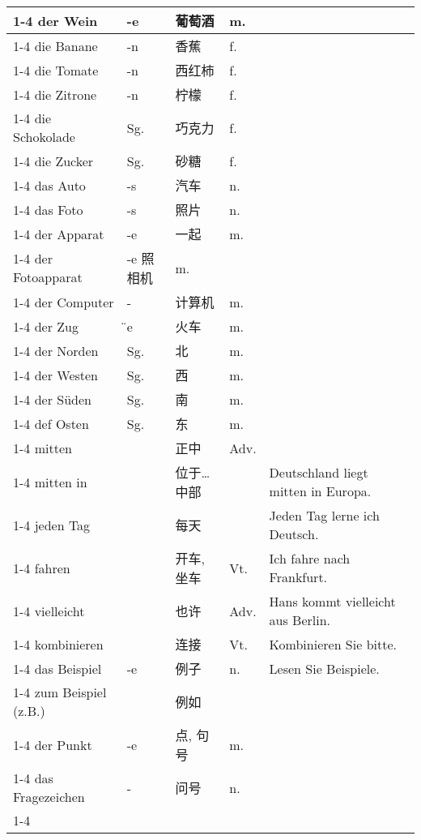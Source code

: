 \documentclass[hidelinks]{ctexart}
\newcommand{\gvocabcline}{\cline{1-4}}
\begin{document}
\begin{longtable}{lllll}
    \gvocabcline
    der Wein & -e & 葡萄酒 & m. \\
    \gvocabcline
    die Banane & -n & 香蕉 & f. \\
    \gvocabcline
    die Tomate & -n & 西红柿 & f. \\
    \gvocabcline
    die Zitrone & -n & 柠檬 & f. \\
    \gvocabcline
    die Schokolade & Sg. & 巧克力 & f. \\
    \gvocabcline
    die Zucker & Sg. & 砂糖 & f. \\
    \gvocabcline
    das Auto & -s & 汽车 & n. \\
    \gvocabcline
    das Foto & -s & 照片 & n. \\
    \gvocabcline
    der Apparat & -e & 一起 & m. \\
    \gvocabcline
    der Fotoapparat & -e 照相机 & m. \\
    \gvocabcline
    der Computer & - & 计算机 & m. \\
    \gvocabcline
    der Zug & \"{}e & 火车 & m. \\
    \gvocabcline
    der Norden & Sg. & 北 & m. \\
    \gvocabcline
    der Westen & Sg. & 西 & m. \\
    \gvocabcline
    der S\"uden & Sg. & 南 & m. \\
    \gvocabcline
    def Osten & Sg. & 东 & m. \\
    \gvocabcline
    mitten & & 正中 & Adv. \\
    \gvocabcline
    mitten in & & 位于\ldots 中部 & & Deutschland liegt mitten in Europa. \\
    \gvocabcline
    jeden Tag & & 每天 & & Jeden Tag lerne ich Deutsch. \\
    \gvocabcline
    fahren & & 开车, 坐车 & Vt. & Ich fahre nach Frankfurt. \\
    \gvocabcline
    vielleicht & & 也许 & Adv. & Hans kommt vielleicht aus Berlin. \\
    \gvocabcline
    kombinieren & & 连接 & Vt. & Kombinieren Sie bitte. \\
    \gvocabcline
    das Beispiel & -e & 例子 & n. & Lesen Sie Beispiele. \\
    \gvocabcline
    zum Beispiel (z.B.) & & 例如 & & \\
    \gvocabcline
    der Punkt & -e & 点, 句号 & m. \\
    \gvocabcline
    das Fragezeichen & - & 问号 & n. \\
    \gvocabcline

\end{longtable}
\end{document}

